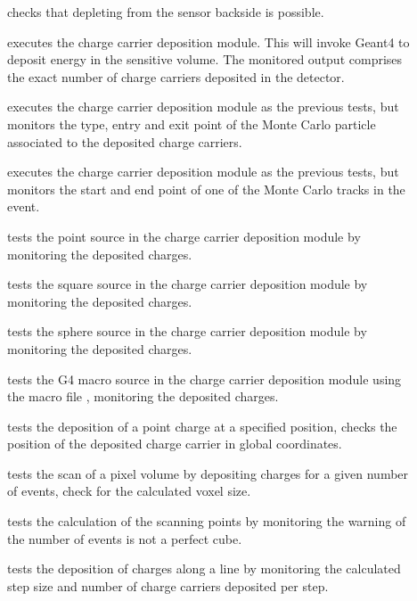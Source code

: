 \begin{description}
    \item[] checks that depleting from the sensor backside is possible.
    \item[] executes the charge carrier deposition module. This will invoke Geant4 to deposit energy in the sensitive volume. The monitored output comprises the exact number of charge carriers deposited in the detector.
    \item[] executes the charge carrier deposition module as the previous tests, but monitors the type, entry and exit point of the Monte Carlo particle associated to the deposited charge carriers.
    \item[] executes the charge carrier deposition module as the previous tests, but monitors the start and end point of one of the Monte Carlo tracks in the event.
    \item[] tests the point source in the charge carrier deposition module by monitoring the deposited charges.
    \item[] tests the square source in the charge carrier deposition module by monitoring the deposited charges.
    \item[] tests the sphere source in the charge carrier deposition module by monitoring the deposited charges.
    \item[] tests the G4 macro source in the charge carrier deposition module using the macro file , monitoring the deposited charges.
    \item[] tests the deposition of a point charge at a specified position, checks the position of the deposited charge carrier in global coordinates.
    \item[] tests the scan of a pixel volume by depositing charges for a given number of events, check for the calculated voxel size.
    \item[] tests the calculation of the scanning points by monitoring the warning of the number of events is not a perfect cube.
    \item[] tests the deposition of charges along a line by monitoring the calculated step size and number of charge carriers deposited per step.

\end{description}
